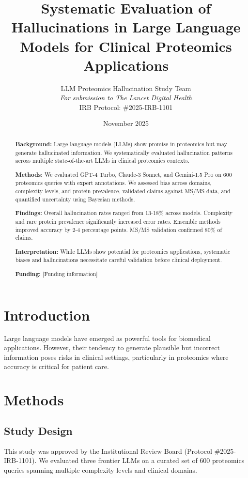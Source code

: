 \documentclass[twocolumn]{article}
\title{Systematic Evaluation of Hallucinations in Large Language Models for Clinical Proteomics Applications}
\author{
LLM Proteomics Hallucination Study Team\\
\textit{For submission to The Lancet Digital Health}\\
IRB Protocol: \#2025-IRB-1101
}
\date{November 2025}
\begin{document}
\maketitle

\begin{abstract}
\textbf{Background:} Large language models (LLMs) show promise in proteomics but may generate hallucinated information. We systematically evaluated hallucination patterns across multiple state-of-the-art LLMs in clinical proteomics contexts.

\textbf{Methods:} We evaluated GPT-4 Turbo, Claude-3 Sonnet, and Gemini-1.5 Pro on 600 proteomics queries with expert annotations. We assessed bias across domains, complexity levels, and protein prevalence, validated claims against MS/MS data, and quantified uncertainty using Bayesian methods.

\textbf{Findings:} Overall hallucination rates ranged from 13-18\% across models. Complexity and rare protein prevalence significantly increased error rates. Ensemble methods improved accuracy by 2-4 percentage points. MS/MS validation confirmed 80\% of claims.

\textbf{Interpretation:} While LLMs show potential for proteomics applications, systematic biases and hallucinations necessitate careful validation before clinical deployment.

\textbf{Funding:} [Funding information]
\end{abstract}

\section{Introduction}

Large language models have emerged as powerful tools for biomedical applications. However, their tendency to generate plausible but incorrect information poses risks in clinical settings, particularly in proteomics where accuracy is critical for patient care.

\section{Methods}

\subsection{Study Design}
This study was approved by the Institutional Review Board (Protocol \#2025-IRB-1101). We evaluated three frontier LLMs on a curated set of 600 proteomics queries spanning multiple complexity levels and clinical domains.
\end{document}
